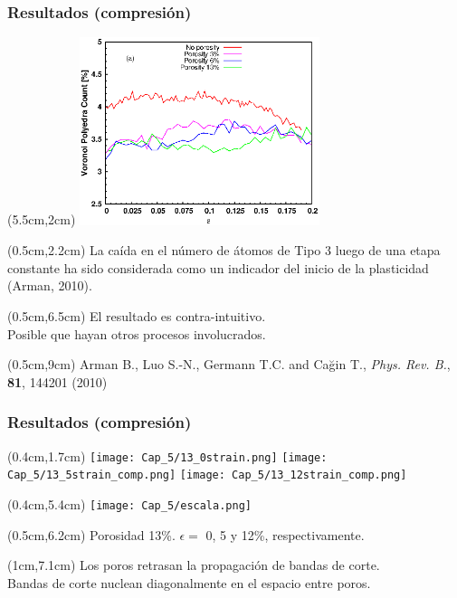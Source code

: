 \begin{frame}
    \frametitle{Resultados (compresi\'on)}
    \begin{textblock*}{7cm}(5.5cm,2cm)
        \includegraphics[width=7cm]{Presentacion_PANACM_Franco/tipe3_strain_comp.eps}
    \end{textblock*}
    \begin{textblock*}{4.8cm}(0.5cm,2.2cm)
        La ca\'ida en el n\'umero de \'atomos de Tipo 3 luego de una etapa constante ha sido considerada como un indicador del inicio de la plasticidad (Arman, 2010).
    \end{textblock*}
    \begin{textblock*}{4.8cm}(0.5cm,6.5cm)
        El resultado es contra-intuitivo.\\%
        Posible que hayan otros procesos involucrados.
    \end{textblock*}
    \begin{textblock*}{12cm}(0.5cm,9cm) %
        \scriptsize{Arman B., Luo S.-N., Germann T.C. and Cağin T., \textit{Phys. Rev. B.}, \textbf{81}, 144201 (2010)}
    \end{textblock*}
\end{frame}

\begin{frame}
    \frametitle{Resultados (compresi\'on)}
    \begin{textblock*}{12cm}(0.4cm,1.7cm)
        \texttt{[image: Cap\_5/13\_0strain.png]}
        \texttt{[image: Cap\_5/13\_5strain\_comp.png]}
        \texttt{[image: Cap\_5/13\_12strain\_comp.png]}\\
    \end{textblock*}
    \begin{textblock*}{12cm}(0.4cm,5.4cm)
     \centering
        \texttt{[image: Cap\_5/escala.png]}
    \end{textblock*}
    \begin{textblock*}{12cm}(0.5cm,6.2cm)
        \centering
        \scriptsize{Porosidad 13\%. $\epsilon=$ 0, 5 y 12\%, respectivamente.}
    \end{textblock*}
    \begin{textblock*}{11cm}(1cm,7.1cm)
      \centering
        Los poros retrasan la propagaci\'on de bandas de corte.\\
        Bandas de corte nuclean diagonalmente en el espacio entre poros.
    \end{textblock*}
\end{frame}

